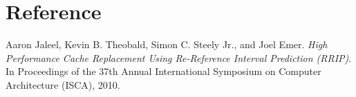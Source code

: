 \documentclass[10pt, conference]{IEEEtran}
\begin{document}
\section{Reference}
Aaron Jaleel, Kevin B. Theobald, Simon C. Steely Jr., and Joel Emer. \emph{High Performance Cache Replacement Using Re-Reference Interval Prediction (RRIP)}. In Proceedings of the 37th Annual International Symposium on Computer Architecture (ISCA), 2010.
\end{document}
